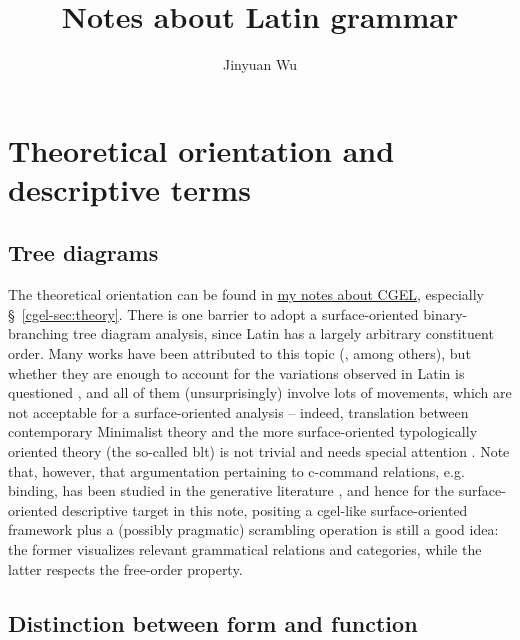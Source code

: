 \documentclass{article}
\title{Notes about Latin grammar}
\author{Jinyuan Wu}
\newcommand*{\citesec}[1]{\S~{#1}}
\newcommand{\cgel}{\href{../English/cambridge.pdf}{my notes about CGEL}}
\begin{document}
\maketitle

\automath

\section{Theoretical orientation and descriptive terms}

\subsection{Tree diagrams}

The theoretical orientation can be found in \cgel, especially \citesec{\ref{cgel-sec:theory}}.
There is one barrier to adopt a surface-oriented binary-branching tree diagram analysis,
since Latin has a largely arbitrary constituent order. 
Many works have been attributed to this topic 
(\citealt{danckaert2011left,devine2006latin}, among others),
but whether they are enough to account for the variations observed in Latin is questioned
\citep{spevak2007latin},
and all of them (unsurprisingly) involve lots of movements,
which are not acceptable for a surface-oriented analysis --
indeed, translation between contemporary Minimalist theory 
and the more surface-oriented typologically oriented theory (the so-called \ac{blt})
is not trivial and needs special attention \citep{clausetypology}.
Note that, however, that argumentation pertaining to c-command relations, e.g. binding,
has been studied in the generative literature \citep{mateu2017latin},
and hence for the surface-oriented descriptive target in this note,
positing a \acs{cgel}-like surface-oriented framework 
plus a (possibly pragmatic) scrambling operation is still a good idea:
the former visualizes relevant grammatical relations and categories,
while the latter respects the free-order property.

\subsection{Distinction between form and function}\label{sec:form-function}
\end{document}

